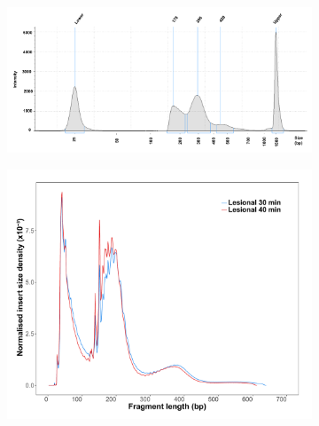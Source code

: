 \begin{figure}[htbp]
\centering
\begin{subfigure}{0.65\textwidth}
\centering
\includegraphics[width=\textwidth]{./Results1/pdfs/ATAC_PS02_tapestation_30min}
\caption{\textbf{}}
\end{subfigure}
\begin{subfigure}{0.45\textwidth}
\centering
\includegraphics[width=\textwidth]{./Results1/pdfs/ATAC_PS-2_30_40_min_fragment_size_distribution}
\caption{\textbf{}}
\end{subfigure}%
\begin{subfigure}{0.45\textwidth}
\centering

\end{subfigure}
\end{figure}
